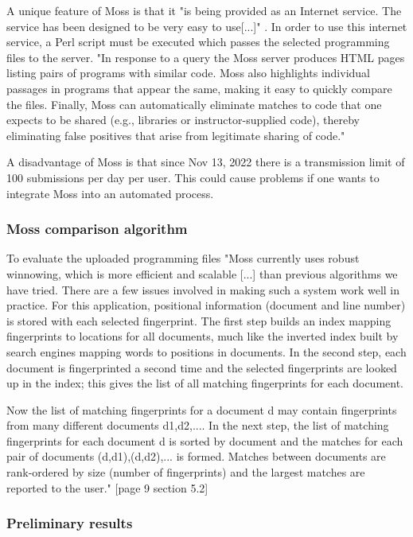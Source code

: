 \documentclass[a4paper, 11pt]{article}
\renewcommand{\\}{\vspace*{0.5\baselineskip} \newline}
\begin{document}
A unique feature of Moss is that it "is being provided as an Internet service. The service has been designed to be very easy to use[...]" \autocite{SMOSS}. In order to use this internet service, a Perl script must be executed which passes the selected programming files to the server. "In response to a query the Moss server produces HTML pages listing pairs of programs with similar code. Moss also highlights individual passages in programs that appear the same, making it easy to quickly compare the files. Finally, Moss can automatically eliminate matches to code that one expects to be shared (e.g., libraries or instructor-supplied code), thereby eliminating false positives that arise from legitimate sharing of code." \autocite{SMOSS}

A disadvantage of Moss is that since Nov 13, 2022 there is a transmission limit of 100 submissions per day per user. This could cause problems if one wants to integrate Moss into an automated process.

\subsubsection{Moss comparison algorithm}

To evaluate the uploaded programming files "Moss currently uses robust winnowing, which is more efficient and scalable [...] than previous algorithms we have tried. There are a few issues involved in making such a system work well in practice. For this application, positional information (document and line number) is stored with each selected fingerprint. The first step builds an index mapping fingerprints to locations for all documents, much like the inverted index built by search engines mapping words to positions in documents. In the second step, each document is fingerprinted a second time and the selected fingerprints are looked up in the index; this gives the list of all matching fingerprints for each document.

Now the list of matching fingerprints for a document d may contain fingerprints from many different documents d1,d2,.... In the next step, the list of matching fingerprints for each document d is sorted by document and the matches for each pair of documents (d,d1),(d,d2),... is formed. Matches between documents are rank-ordered by size (number of fingerprints) and the largest matches are reported to the user." \autocite{WMOSS}[page 9 section 5.2]

\subsubsection{Preliminary results}
\end{document}
